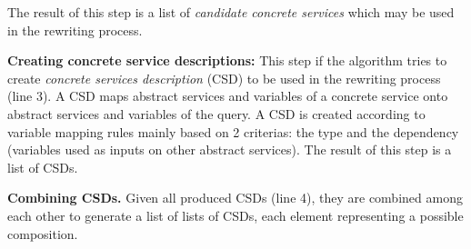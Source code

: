 The result of this step is a list of \textit{candidate concrete services} which
may be used in the rewriting process.


\noindent \textbf{Creating concrete service descriptions:} This step if the
 algorithm tries to create \textit{concrete services description} (CSD) to be
 used in the rewriting process (line 3). A CSD maps abstract services and
 variables of a concrete service onto abstract services and variables of the
 query. A CSD is created 
according to variable mapping rules mainly based on 2 criterias: the type and the dependency (variables used as inputs on other abstract services). 
The  result of this step is a list of CSDs.
  

 
\noindent \textbf{Combining CSDs.} Given all produced CSDs  (line
4), they are combined among each other to generate  a list of lists of CSDs, each element representing a possible composition.

